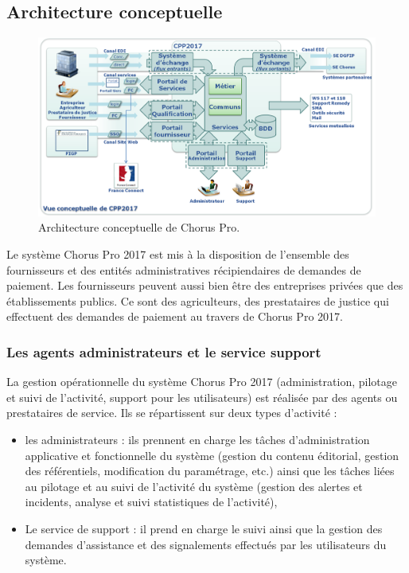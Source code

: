 \documentclass[12pt,a4paper]{article}
\begin{document}
\subsection{Architecture conceptuelle}
\begin{figure}[H]
	\begin{center}
		\includegraphics[width=\textwidth, height=\textheight, keepaspectratio]{archiConceptuelle.png}
		\caption{Architecture conceptuelle de Chorus Pro.}
	\end{center}
\end{figure}
Le système Chorus Pro 2017 est mis à la disposition de l’ensemble des fournisseurs et des entités administratives récipiendaires de demandes de paiement. Les fournisseurs peuvent aussi bien être des entreprises privées que des établissements publics. Ce sont des agriculteurs, des prestataires de justice qui effectuent des demandes de paiement au travers de Chorus Pro 2017.
\subsubsection{Les agents administrateurs et le service support}
La gestion opérationnelle du système Chorus Pro 2017 (administration, pilotage et suivi de l’activité, support pour les utilisateurs) est réalisée par des agents ou prestataires de service. Ils se répartissent sur deux types d’activité : 
\begin{itemize}
\item les administrateurs : ils prennent en charge les tâches d’administration applicative et fonctionnelle du système (gestion du contenu éditorial, gestion des référentiels, modification du paramétrage, etc.) ainsi que les tâches liées au pilotage et au suivi de l’activité du système (gestion des alertes et incidents, analyse et suivi statistiques de l’activité),
\item Le service de support : il prend en charge le suivi ainsi que la gestion des demandes d’assistance et des signalements effectués par les utilisateurs du système.
\end{itemize}
\end{document}
